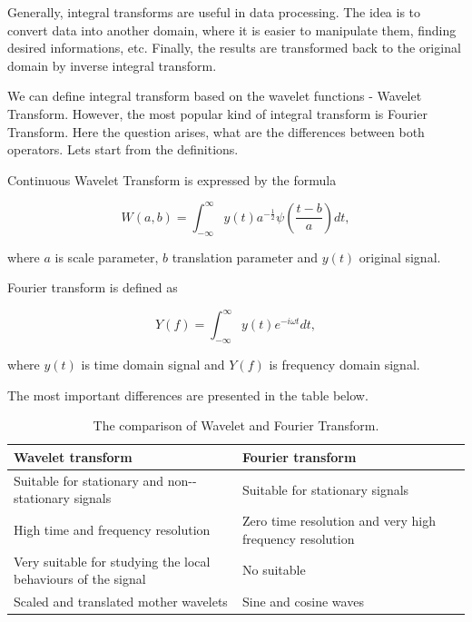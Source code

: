 Generally, integral transforms are useful in data processing. The idea is to convert data into another domain, where it is easier to manipulate them, finding desired informations, etc. Finally, the results are transformed back to the original domain by inverse integral transform.

We can define integral transform based on the wavelet functions - Wavelet Transform.
However, the most popular kind of integral transform is Fourier Transform. Here the question arises, what are the differences between both operators. Lets start from the definitions.

\begin{defn}
\label{def:CWT}
Continuous Wavelet Transform is expressed by the formula

\begin{equation}
W(a,b)=\int_{-\infty}^{\infty} y(t) a^{-\frac{1}{2}} \psi\left(\frac{t-b}{a}\right) dt,
\end{equation}

where $a$ is scale parameter, $b$ translation parameter and $y(t)$ original signal.
\end{defn}


\begin{defn}
Fourier transform is defined as

\begin{equation}
Y(f)=\int_{-\infty}^{\infty} y(t) e^{-i\omega t} dt,
\end{equation}

where $y(t)$ is time domain signal and $Y(f)$ is frequency domain signal.
\end{defn}

The most important differences are presented in the table below.

\begin{table}[h]
\centering
\begin{tabular}{|p{0.5\linewidth}|p{0.5\linewidth}|}
\toprule
\textbf{ Wavelet transform} & \textbf{Fourier transform}
\\ \midrule
Suitable for stationary and non-\allowbreak -stationary signals 
& Suitable for stationary signals 
\\ \midrule
High time and frequency resolution
& Zero time resolution and very high frequency resolution     
\\ \midrule
Very suitable for studying the local behaviours of the signal
& No suitable  
\\ \midrule
Scaled and translated mother wavelets
& Sine and cosine waves
\\ \bottomrule
\end{tabular}
\caption{The comparison of Wavelet and Fourier Transform.}
\end{table}

